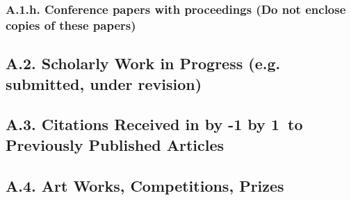 \documentclass[10pt]{article}
\newcommand\LastYear{ %
  \advance\year by -1 \the\year\advance\year by 1}
\begin{document}
\subsubsection*{A.1.h. Conference papers with proceedings (Do not enclose copies of these papers)}



\subsection*{A.2. Scholarly Work in Progress (e.g. submitted, under revision)}



\subsection*{A.3. Citations Received in \LastYear ~to Previously Published Articles}



\subsection*{A.4. Art Works, Competitions, Prizes}
\end{document}

